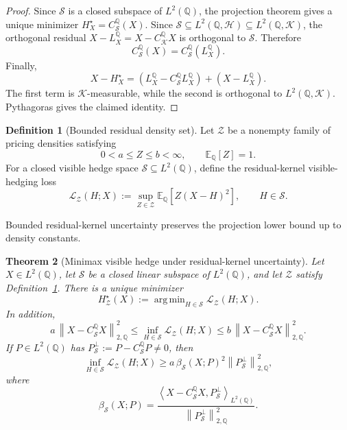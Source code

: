 \documentclass[11pt,a4paper]{amsart}
\theoremstyle{plain}
\newtheorem{theorem}{Theorem}[section]
\theoremstyle{definition}
\newtheorem{definition}[theorem]{Definition}
\theoremstyle{remark}
\DeclareMathOperator{\argmin}{arg\,min}
\newcommand{\QQ}{\mathbb{Q}}
\newcommand{\EE}{\mathbb{E}}
\newcommand{\cH}{\mathcal{H}}
\newcommand{\cK}{\mathcal{K}}
\newcommand{\cS}{\mathcal{S}}
\newcommand{\cZ}{\mathcal{Z}}
\newcommand{\norm}[1]{\left\lVert #1\right\rVert}
\newcommand{\ip}[2]{\left\langle #1,#2\right\rangle}
\begin{document}
\begin{proof}
Since \(\cS\) is a closed subspace of \(L^2(\QQ)\), the projection theorem gives a unique minimizer
\(H_X^\star=C_{\cS}^{\QQ}(X)\).  Since \(\cS\subseteq L^2(\QQ,\cH)\subseteq L^2(\QQ,\cK)\), the
orthogonal residual \(X-L_X^\QQ=X-C_{\cK}^{\QQ}X\) is orthogonal to \(\cS\).  Therefore
\[
        C_{\cS}^{\QQ}(X)=C_{\cS}^{\QQ}(L_X^\QQ).
\]
Finally,
\[
        X-H_X^\star
        =
        (L_X^\QQ-C_{\cS}^{\QQ}L_X^\QQ)
        +
        (X-L_X^\QQ).
\]
The first term is \(\cK\)-measurable, while the second is orthogonal to
\(L^2(\QQ,\cK)\).  Pythagoras gives the claimed identity.
\end{proof}

\begin{definition}[Bounded residual density set]\label{def:bounded-residual-model-set}
Let \(\cZ\) be a nonempty family of pricing densities satisfying
\[
        0<a\le Z\le b<\infty,
        \qquad
        \EE_\QQ[Z]=1.
\]
For a closed visible hedge space \(\cS\subseteq L^2(\QQ)\), define the residual-kernel visible-hedging loss
\[
        \mathcal L_{\cZ}(H;X)
        :=
        \sup_{Z\in\cZ}\EE_\QQ[Z(X-H)^2],
        \qquad H\in\cS.
\]
\end{definition}

Bounded residual-kernel uncertainty preserves the projection lower bound up to density constants.

\begin{theorem}[Minimax visible hedge under residual-kernel uncertainty]\label{thm:minimax-visible-hedge}
Let \(X\in L^2(\QQ)\), let \(\cS\) be a closed linear subspace of \(L^2(\QQ)\), and let \(\cZ\)
satisfy Definition~\ref{def:bounded-residual-model-set}.  There is a unique minimizer
\[
        H_{\cZ}^{\star}(X)
        :=
        \argmin_{H\in\cS}\mathcal L_{\cZ}(H;X).
\]
In addition,
\[
        a\,\norm{X-C_{\cS}^{\QQ}X}_{2,\QQ}^2
        \le
        \inf_{H\in\cS}\mathcal L_{\cZ}(H;X)
        \le
        b\,\norm{X-C_{\cS}^{\QQ}X}_{2,\QQ}^2.
\]
If \(P\in L^2(\QQ)\) has \(P_{\cS}^{\perp}:=P-C_{\cS}^{\QQ}P\ne0\), then
\[
        \inf_{H\in\cS}\mathcal L_{\cZ}(H;X)
        \ge
        a\,\beta_{\cS}(X;P)^2\norm{P_{\cS}^{\perp}}_{2,\QQ}^2,
\]
where
\[
        \beta_{\cS}(X;P)
        =
        \frac{\ip{X-C_{\cS}^{\QQ}X}{P_{\cS}^{\perp}}_{L^2(\QQ)}}
        {\norm{P_{\cS}^{\perp}}_{2,\QQ}^2}.
\]
\end{theorem}
\end{document}

